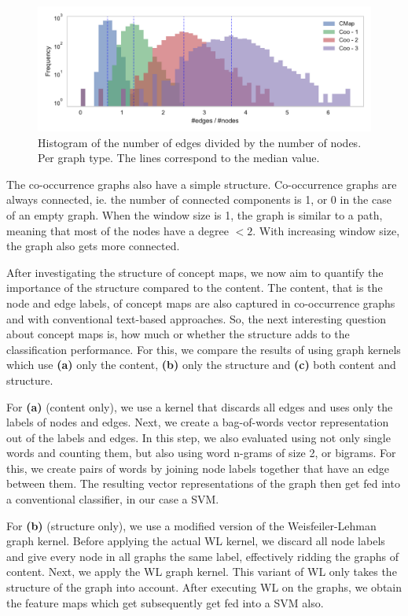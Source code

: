\begin{figure}[ht]
\centering
\includegraphics[width=0.7\linewidth]{assets/figures/hist-edgesnodes.pdf}
\caption{Histogram of the number of edges divided by the number of nodes. Per graph type. The lines correspond to the median value.}
\label{fig:histogram-edges-div-nodes-per-type}
\end{figure}

The co-occurrence graphs also have a simple structure.
Co-occurrence graphs are always connected, ie. the number of connected components is 1, or 0 in the case of an empty graph.
When the window size is 1, the graph is similar to a path, meaning that most of the nodes have a degree $< 2$. With increasing window size, the graph also gets more connected.

After investigating the structure of concept maps, we now aim to quantify the importance of the structure compared to the content.
The content, that is the node and edge labels, of concept maps are also captured in co-occurrence graphs and with conventional text-based approaches. So, the next interesting question about concept maps is, how much or whether the structure adds to the classification performance.
For this, we compare the results of using graph kernels which use \textbf{(a)} only the content, \textbf{(b)} only the structure and \textbf{(c)} both content and structure.

For \textbf{(a)} (content only), we use a kernel that discards all edges and uses only the labels of nodes and edges. Next, we create a bag-of-words vector representation out of the labels and edges.
In this step, we also evaluated using not only single words and counting them, but also using word n-grams of size 2, or bigrams.
For this, we create pairs of words by joining node labels together that have an edge between them.
The resulting vector representations of the graph then get fed into a conventional classifier, in our case a SVM.

For \textbf{(b)} (structure only), we use a modified version of the Weisfeiler-Lehman graph kernel. Before applying the actual WL kernel, we discard all node labels and give every node in all graphs the same label, effectively ridding the graphs of content. Next, we apply the WL graph kernel. This variant of WL only takes the structure of the graph into account.
After executing WL on the graphs, we obtain the feature maps which get subsequently get fed into a SVM also.

